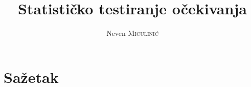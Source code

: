 \documentclass[times, utf8, seminar, numeric]{fer}
\begin{document}
\nocite{*}

\title{Statističko testiranje očekivanja}

\author{Neven \textsc{Miculinić}}


\maketitle

\tableofcontents

\graphicspath{{Pictures/}} 

 







\chapter{Sažetak}
\end{document}
